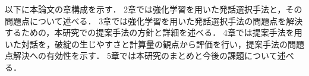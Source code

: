 \documentclass[12pt,a4paper,twoside,openany]{jbook}
\begin{document}
以下に本論文の章構成を示す．
2章では強化学習を用いた発話選択手法と，その問題点について述べる．
3章では強化学習を用いた発話選択手法の問題点を解決するための，本研究での提案手法の方針と詳細を述べる．
4章では提案手法を用いた対話を，破綻の生じやすさと計算量の観点から評価を行い，提案手法の問題点解決への有効性を示す．
5章では本研究のまとめと今後の課題について述べる．

\end{document}
